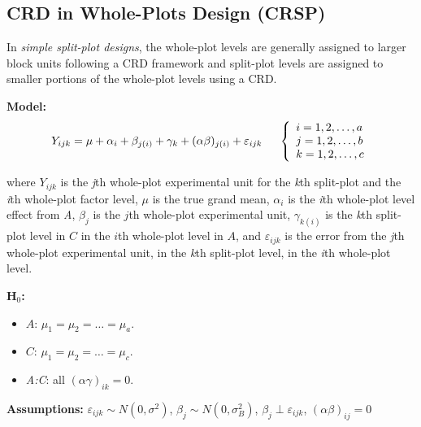 \documentclass[12pt,english]{article}\usepackage[]{graphicx}\usepackage[table]{xcolor}
\begin{document}
\subsection{CRD in Whole-Plots Design (CRSP)}
In \textit{simple split-plot designs}, the whole-plot levels are generally assigned to larger block units following a CRD framework and split-plot levels are  assigned to smaller portions of the whole-plot levels using a CRD.
\vspace{0.05in}

\noindent\textbf{Model:} \[Y_{ijk} = \mu + \alpha_i + \beta_{j(i)} + \gamma_k + (\alpha\beta)_{j(i)} + \varepsilon_{ijk} \hspace{0.2in} \left\{
                \begin{array}{ll}
                  i = 1,2,\dots,a\\
                  j = 1,2,\dots,b\\
                  k = 1,2,\dots,c
                \end{array}
              \right.\]

\noindent where $Y_{ijk}$ is the \textit{j}th whole-plot experimental unit for the \textit{k}th split-plot and the \textit{i}th whole-plot factor level, $\mu$ is the true grand mean, $\alpha_i$ is the \textit{i}th whole-plot level effect from \textit{A}, $\beta_j$ is the $j$th whole-plot experimental unit, $\gamma_{k(i)}$ is the \textit{k}th split-plot level in $C$ in the $i$th whole-plot level in $A$, and $\varepsilon_{ijk}$ is the error from the \textit{j}th whole-plot experimental unit, in the \textit{k}th split-plot level, in the \textit{i}th whole-plot level.
\vspace{0.05in}

\noindent \textbf{H$_0$:}
\begin{itemize}
\item $A$: $\mu_1 = \mu_2 = \dots = \mu_a$.
\item $C$: $\mu_1 = \mu_2 = \dots = \mu_c$.
\item \textit{A:C}: all $(\alpha\gamma)_{ik} = 0$.
\end{itemize}
\vspace{0.1in}

\noindent \textbf{Assumptions:} $\varepsilon_{ijk} \sim N(0, \sigma^2)$,  \hspace{0.1in} $\beta_j \sim N(0, \sigma^2_B)$, \hspace{0.1in} $\beta_j \perp \varepsilon_{ijk}$, \hspace{0.1in} $(\alpha\beta)_{ij} = 0$
\vspace{0.1in}
\end{document}

